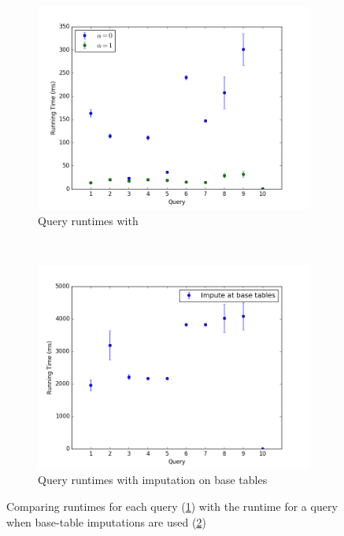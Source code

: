 \begin{figure}
\begin{subfigure}{\linewidth}
\includegraphics[width=\columnwidth]{figures/running_times_imputedb.png}
\caption{Query runtimes with \ProjectName{}}
\label{subfig:project-runtime-queries}
\end{subfigure}
~
\begin{subfigure}{\linewidth}
\includegraphics[width=\columnwidth]{figures/running_times_base_tables.png}
\caption{Query runtimes with imputation on base tables}
\label{subfig:base-runtime-queries}
\end{subfigure}
\caption{Comparing \ProjectName{} runtimes for each query
    (\ref{subfig:project-runtime-queries}) with the runtime for a query when base-table
    imputations are used (\ref{subfig:base-runtime-queries})}
\label{fig:runtimes}
\end{figure}

